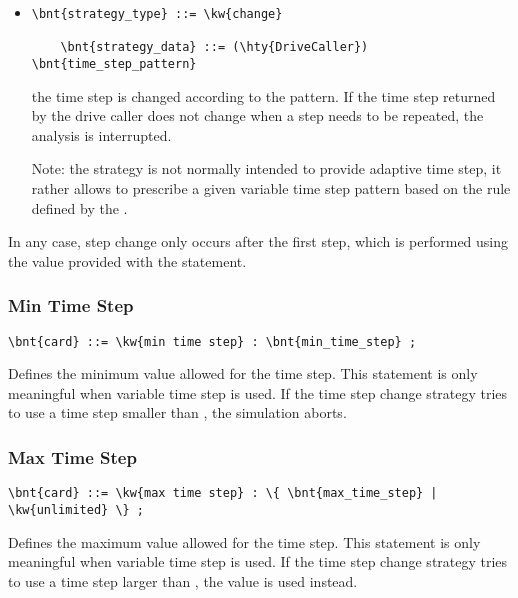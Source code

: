 \begin{itemize}
\item {}
\begin{Verbatim}[commandchars=\\\{\}]
    \bnt{strategy_type} ::= \kw{change}

    \bnt{strategy_data} ::= (\hty{DriveCaller}) \bnt{time_step_pattern}
\end{Verbatim}
the time step is changed according to the  pattern.
If the time step returned by the drive caller does not change
when a step needs to be repeated, the analysis is interrupted.

Note: the  strategy is not normally intended to provide
adaptive time step, it rather allows to prescribe a given
variable time step pattern based on the rule defined
by the  .
\end{itemize}
In any case, step change only occurs after the first step, which is performed
using the  value provided with the  statement.


\subsubsection{Min Time Step}
\begin{Verbatim}[commandchars=\\\{\}]
    \bnt{card} ::= \kw{min time step} : \bnt{min_time_step} ;
\end{Verbatim}
Defines the minimum value allowed for the time step.
This statement is only meaningful when variable time step is used.
If the time step change strategy tries to use a time step smaller
than , the simulation aborts.

\subsubsection{Max Time Step}
\begin{Verbatim}[commandchars=\\\{\}]
    \bnt{card} ::= \kw{max time step} : \{ \bnt{max_time_step} | \kw{unlimited} \} ;
\end{Verbatim}
Defines the maximum value allowed for the time step.
This statement is only meaningful when variable time step is used.
If the time step change strategy tries to use a time step larger
than , the value  is used instead.

